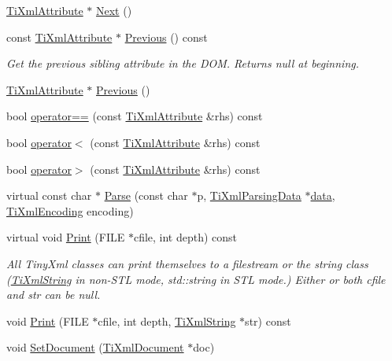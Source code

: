 \begin{DoxyCompactItemize}
\hyperlink{class_ti_xml_attribute}{TiXmlAttribute} $\ast$ \hyperlink{class_ti_xml_attribute_a138320aa7793b148ba7e5bd0a0ea4db6}{Next} ()
\item 
const \hyperlink{class_ti_xml_attribute}{TiXmlAttribute} $\ast$ \hyperlink{class_ti_xml_attribute_a54a5f8730c7b02b9a41b74e12e27fe86}{Previous} () const 
\begin{DoxyCompactList}\small\item\em Get the previous sibling attribute in the DOM. Returns null at beginning. \end{DoxyCompactList}\item 
\hyperlink{class_ti_xml_attribute}{TiXmlAttribute} $\ast$ \hyperlink{class_ti_xml_attribute_ae4dabc932cba945ed1e92fec5f121193}{Previous} ()
\item 
bool \hyperlink{class_ti_xml_attribute_ae48c2a65b520d453914ce4e845d607cf}{operator==} (const \hyperlink{class_ti_xml_attribute}{TiXmlAttribute} \&rhs) const 
\item 
bool \hyperlink{class_ti_xml_attribute_adb8b6f2cad5948e73e383182e7ce10de}{operator$<$} (const \hyperlink{class_ti_xml_attribute}{TiXmlAttribute} \&rhs) const 
\item 
bool \hyperlink{class_ti_xml_attribute_a867562769ef9778c1690cd373246b05b}{operator$>$} (const \hyperlink{class_ti_xml_attribute}{TiXmlAttribute} \&rhs) const 
\item 
virtual const char $\ast$ \hyperlink{class_ti_xml_attribute_ad62774421b814894b995af3b5d231dda}{Parse} (const char $\ast$p, \hyperlink{class_ti_xml_parsing_data}{TiXmlParsingData} $\ast$\hyperlink{bootstrap_8cc_a923b2158227405b9f7a6eceb6c7104c8}{data}, \hyperlink{tinyxml_8h_a88d51847a13ee0f4b4d320d03d2c4d96}{TiXmlEncoding} encoding)
\item 
virtual void \hyperlink{class_ti_xml_attribute_acc04956c1d5c4c31fe74f7a7528d109a}{Print} (FILE $\ast$cfile, int depth) const 
\begin{DoxyCompactList}\small\item\em All TinyXml classes can print themselves to a filestream or the string class (\hyperlink{class_ti_xml_string}{TiXmlString} in non-\/STL mode, std::string in STL mode.) Either or both cfile and str can be null. \end{DoxyCompactList}\item 
void \hyperlink{class_ti_xml_attribute_a3d37828add129dc17af033d98e4812cf}{Print} (FILE $\ast$cfile, int depth, \hyperlink{class_ti_xml_string}{TiXmlString} $\ast$str) const 
\item 
void \hyperlink{class_ti_xml_attribute_ac12a94d4548302afb12f488ba101f7d1}{SetDocument} (\hyperlink{class_ti_xml_document}{TiXmlDocument} $\ast$doc)
\end{DoxyCompactItemize}
